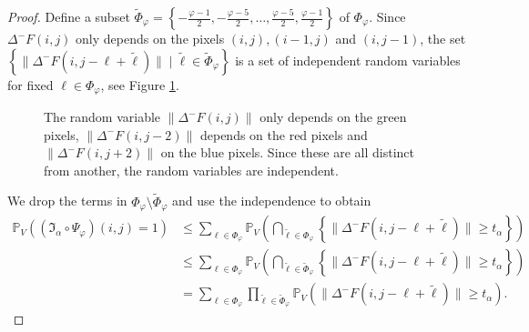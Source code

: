 \documentclass[a4paper,12pt]{article}
\newcommand{\norm}[1]{\lVert#1\rVert}
\theoremstyle{plain}
\theoremstyle{definition}
\begin{document}
\begin{proof}
	Define a subset $\tilde{\Phi}_\varphi = \left\{ -\frac{\varphi - 1}{2}, -\frac{\varphi - 5}{2}, \dots, \frac{\varphi - 5}{2}, \frac{\varphi - 1}{2} \right\}$ of $\Phi_\varphi$. Since $\Delta^- F(i, j)$ only depends on the pixels $(i, j), (i - 1, j)$ and $(i, j - 1)$, the set $\left\{ \norm{\Delta^- F(i, j - \ell + \tilde{\ell})} \mid \tilde{\ell} \in \tilde{\Phi}_\varphi \right\}$ is a set of independent random variables for fixed $\ell \in \Phi_\varphi$, see Figure \ref{fig: independentpoints}.
	
	\begin{figure}[h]
		\centering
		\caption{The random variable $\norm{\Delta^- F(i, j)}$ only depends on the green pixels, $\norm{\Delta^- F(i, j - 2)}$ depends on the red pixels and $\norm{\Delta^- F(i, j + 2)}$ on the blue pixels. Since these are all distinct from another, the random variables are independent.}
		\label{fig: independentpoints}
	\end{figure}
	
	We drop the terms in $\Phi_\varphi \setminus \tilde{\Phi}_\varphi$ and use the independence to obtain
	\begin{align*}
		\mathbb{P}_V\left( (\mathfrak{I}_\alpha \circ \Psi_\varphi)(i, j) = 1 \right) &\leq \sum_{\ell \in \Phi_\varphi} \mathbb{P}_V\left( \bigcap_{\tilde{\ell} \in \Phi_\varphi} \left\{ \norm{\Delta^- F(i, j - \ell + \tilde{\ell})} \geq t_\alpha \right\} \right) \\
		&\leq \sum_{\ell \in \Phi_\varphi} \mathbb{P}_V\left( \bigcap_{\tilde{\ell} \in \tilde{\Phi}_\varphi} \left\{ \norm{\Delta^- F(i, j - \ell + \tilde{\ell})} \geq t_\alpha \right\} \right) \\
		&= \sum_{\ell \in \Phi_\varphi} \prod_{\tilde{\ell} \in \tilde{\Phi}_\varphi} \mathbb{P}_V\left( \norm{\Delta^- F(i, j - \ell + \tilde{\ell})} \geq t_\alpha \right).
	\end{align*}
	

\end{proof}
\end{document}
